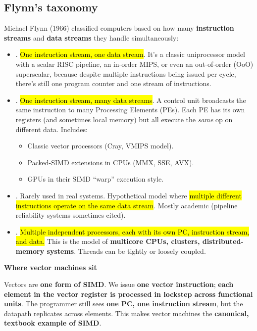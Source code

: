 \subsection{Flynn's taxonomy}

Michael Flynn (1966) classified computers based on how many \textbf{instruction streams} and \textbf{data streams} they handle simultaneously:
\begin{itemize}
    \item {}. \hl{One instruction stream, one data stream}. It's a classic uniprocessor model with a scalar RISC pipeline, an in-order MIPS, or even an out-of-order (OoO) superscalar, because despite multiple instructions being issued per cycle, there's still one program counter and one stream of instructions.

    \item {}. \hl{One instruction stream, many data streams}. A control unit broadcasts the same instruction to many Processing Elements (PEs). Each PE has its own registers (and sometimes local memory) but all execute the \emph{same} op on different data. Includes:
    \begin{itemize}
        \item Classic vector processors (Cray, VMIPS model).
        \item Packed-SIMD extensions in CPUs (MMX, SSE, AVX).
        \item GPUs in their SIMD ``warp'' execution style.
    \end{itemize}

    \item {}. Rarely used in real systems. Hypothetical model where \hl{multiple different instructions operate on the same data stream}. Mostly academic (pipeline reliability systems sometimes cited).

    \item \label{def: MIMD} . \hl{Multiple independent processors, each with its own PC, instruction stream, and data.} This is the model of \textbf{multicore CPUs, clusters, distributed-memory systems}. Threads can be tightly or loosely coupled.
\end{itemize}

\highspace
\begin{flushleft}
    \textcolor{Green3}{ \textbf{Where vector machines sit}}
\end{flushleft}
Vectors are \textbf{one form of SIMD}. We issue \textbf{one vector instruction}; \textbf{each element in the vector register is processed in lockstep across functional units}. The programmer still sees \textbf{one PC, one instruction stream}, but the datapath replicates across elements. This makes vector machines the \textbf{canonical, textbook example of SIMD}.

